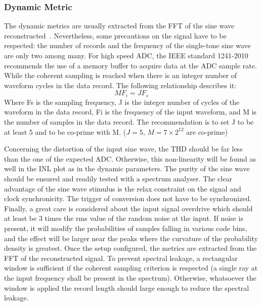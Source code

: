     \subsubsection{Dynamic Metric}
The dynamic metrics are usually extracted from the FFT of the sine wave reconstructed~\cite{IEEESTD1241-2010}. Nevertheless, some precautions on the signal have to be respected: the number of records and the frequency of the single-tone sine wave are only two among many.
For high speed ADC, the IEEE standard 1241-2010 recommends the use of a memory buffer to acquire data at the ADC sample rate. While the coherent sampling is reached when there is an integer number of waveform cycles in the data record. The following relationship describes it:
    \begin{equation}
        M F_i = J F_s
    \end{equation}
Where Fs is the sampling frequency, J is the integer number of cycles of the waveform in the data record, Fi is the frequency of the input waveform, and M is the number of samples in the data record. The recommendation is to set J to be at least 5 and to be co-prime with M. ($J = 5$, $M = 7\times2^{12}$ are co-prime)

Concerning the distortion of the input sine wave, the THD should be far less than the one of the expected ADC\@. Otherwise, this non-linearity will be found as well in the INL plot as in the dynamic parameters. The purity of the sine wave should be ensured and readily tested with a spectrum analyser.
The clear advantage of the sine wave stimulus is the relax constraint on the signal and clock synchronicity. The trigger of conversion does not have to be synchronized.
Finally, a great care is considered about the input signal overdrive which should at least be 3 times the rms value of the random noise at the input. If noise is present, it will modify the probabilities of samples falling in various code bins, and the effect will be larger near the peaks where the curvature of the probability density is greatest.
Once the setup configured, the metrics are extracted from the FFT of the reconstructed signal. To prevent spectral leakage, a rectangular window is sufficient if the coherent sampling criterion is respected (a single ray at the input frequency shall be present in the spectrum). Otherwise, whatsoever the window is applied the record length should large enough to reduce the spectral leakage.

